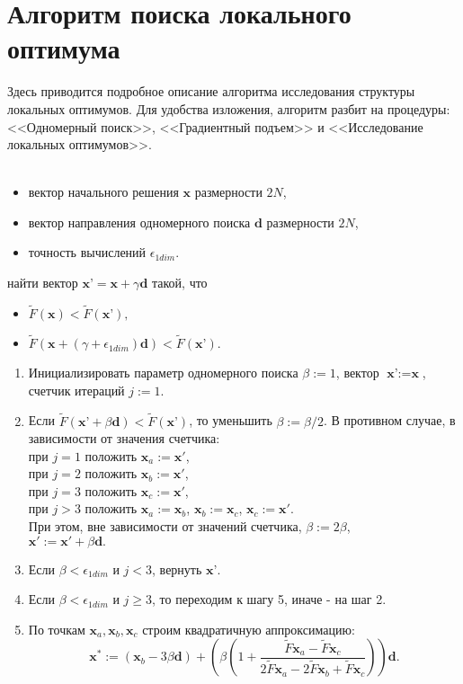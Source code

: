 \chapter{Алгоритм поиска локального оптимума}\label{app:A}


Здесь приводится подробное описание алгоритма исследования структуры локальных оптимумов. Для удобства изложения, алгоритм разбит
на процедуры: <<Одномерный поиск>>, <<Градиентный подъем>> и <<Исследование локальных оптимумов>>.
\\ \\

\begin{itemize}
  \item вектор начального решения $\textbf{x}$ размерности $2N$,
  \item вектор направления одномерного поиска $\textbf{d}$ размерности $2N$,
  \item точность вычислений $\epsilon_{1dim}$.
\end{itemize}
 найти вектор $\textbf{x'} = \textbf{x} + \gamma \textbf{d}$ такой, что
\begin{itemize}
  \item $\tilde{F}(\textbf{x}) < \tilde{F}(\textbf{x'}),$
  \item $\tilde{F}(\textbf{x} + (\gamma + \epsilon_{1dim}) \textbf{d}) < \tilde{F}(\textbf{x'}).$
\end{itemize}
\begin{enumerate}
  \item Инициализировать параметр одномерного поиска $\beta := 1$, вектор $\textbf{x'} := \textbf{x}$, счетчик итераций $j := 1$.
  \item Если $\tilde{F}(\textbf{x'} + \beta \textbf{d}) < \tilde{F}(\textbf{x'})$, то уменьшить $\beta := \beta / 2$.
  В противном случае, в зависимости от значения счетчика:\\
  при $j = 1$ положить $\textbf{x}_a := \textbf{x}'$,\\
  при $j = 2$ положить $\textbf{x}_b := \textbf{x}'$,\\
  при $j = 3$ положить $\textbf{x}_c := \textbf{x}'$,\\
  при $j > 3$ положить $\textbf{x}_a := \textbf{x}_b$, $\textbf{x}_b := \textbf{x}_c$, $\textbf{x}_c := \textbf{x}'$.\\
  При этом, вне зависимости от значений счетчика, $\beta := 2\beta$,\\
  $\textbf{x}' := \textbf{x}' + \beta \textbf{d}.$
  \item Если $\beta < \epsilon_{1dim}$ и $j < 3$, вернуть $\textbf{x'}$.
  \item Если $\beta < \epsilon_{1dim}$ и $j \geq 3$, то переходим к шагу 5, иначе - на шаг 2.
  \item По точкам $\textbf{x}_a, \textbf{x}_b, \textbf{x}_c$ строим квадратичную аппроксимацию:
   $$\textbf{x}^{*} := (\textbf{x}_b - 3 \beta \textbf{d}) +
   \left(\beta\left(1 + \frac{\tilde{F}\textbf{x}_a - \tilde{F}\textbf{x}_c}{2\tilde{F}\textbf{x}_a -
   2\tilde{F}\textbf{x}_b + \tilde{F}\textbf{x}_c}\right)\right)\textbf{d}.$$\\
\end{enumerate}
